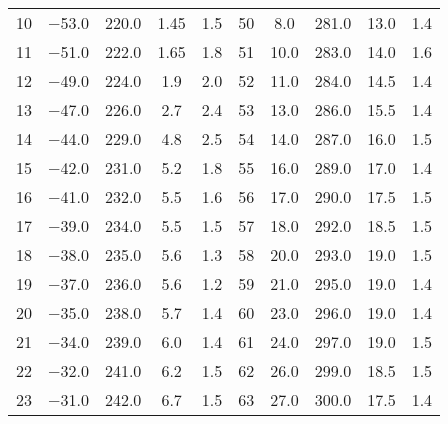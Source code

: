 \begin{table}
\begin{tabular}{S S S S S | S S S S S}
      \num{10} &  \num{-53.0} &  \num{220.0} &  \num{ 1.45} &  \num{1.5} & \num{50} &  \num{  8.0} &  \num{281.0} &  \num{13.0 } &  \num{1.4} \\ 
      \num{11} &  \num{-51.0} &  \num{222.0} &  \num{ 1.65} &  \num{1.8} & \num{51} &  \num{ 10.0} &  \num{283.0} &  \num{14.0 } &  \num{1.6} \\ 
      \num{12} &  \num{-49.0} &  \num{224.0} &  \num{ 1.9 } &  \num{2.0} & \num{52} &  \num{ 11.0} &  \num{284.0} &  \num{14.5 } &  \num{1.4} \\ 
      \num{13} &  \num{-47.0} &  \num{226.0} &  \num{ 2.7 } &  \num{2.4} & \num{53} &  \num{ 13.0} &  \num{286.0} &  \num{15.5 } &  \num{1.4} \\ 
      \num{14} &  \num{-44.0} &  \num{229.0} &  \num{ 4.8 } &  \num{2.5} & \num{54} &  \num{ 14.0} &  \num{287.0} &  \num{16.0 } &  \num{1.5} \\ 
      \num{15} &  \num{-42.0} &  \num{231.0} &  \num{ 5.2 } &  \num{1.8} & \num{55} &  \num{ 16.0} &  \num{289.0} &  \num{17.0 } &  \num{1.4} \\ 
      \num{16} &  \num{-41.0} &  \num{232.0} &  \num{ 5.5 } &  \num{1.6} & \num{56} &  \num{ 17.0} &  \num{290.0} &  \num{17.5 } &  \num{1.5} \\ 
      \num{17} &  \num{-39.0} &  \num{234.0} &  \num{ 5.5 } &  \num{1.5} & \num{57} &  \num{ 18.0} &  \num{292.0} &  \num{18.5 } &  \num{1.5} \\ 
      \num{18} &  \num{-38.0} &  \num{235.0} &  \num{ 5.6 } &  \num{1.3} & \num{58} &  \num{ 20.0} &  \num{293.0} &  \num{19.0 } &  \num{1.5} \\ 
      \num{19} &  \num{-37.0} &  \num{236.0} &  \num{ 5.6 } &  \num{1.2} & \num{59} &  \num{ 21.0} &  \num{295.0} &  \num{19.0 } &  \num{1.4} \\ 
      \num{20} &  \num{-35.0} &  \num{238.0} &  \num{ 5.7 } &  \num{1.4} & \num{60} &  \num{ 23.0} &  \num{296.0} &  \num{19.0 } &  \num{1.4} \\ 
      \num{21} &  \num{-34.0} &  \num{239.0} &  \num{ 6.0 } &  \num{1.4} & \num{61} &  \num{ 24.0} &  \num{297.0} &  \num{19.0 } &  \num{1.5} \\ 
      \num{22} &  \num{-32.0} &  \num{241.0} &  \num{ 6.2 } &  \num{1.5} & \num{62} &  \num{ 26.0} &  \num{299.0} &  \num{18.5 } &  \num{1.5} \\ 
      \num{23} &  \num{-31.0} &  \num{242.0} &  \num{ 6.7 } &  \num{1.5} & \num{63} &  \num{ 27.0} &  \num{300.0} &  \num{17.5 } &  \num{1.4} \\ 

\end{tabular}
\end{table}
